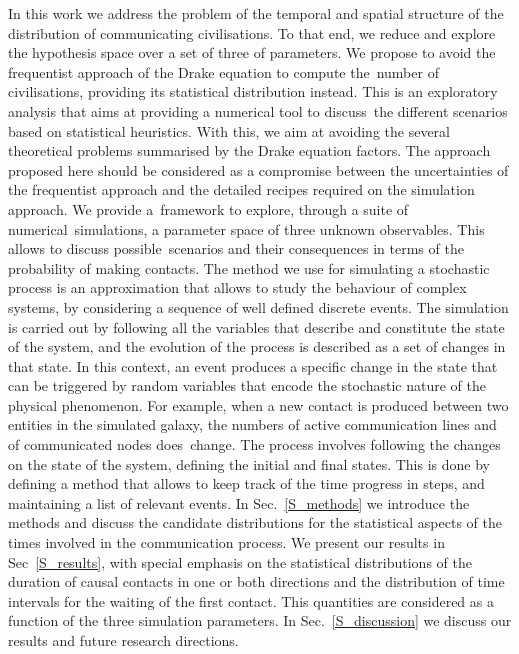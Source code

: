 \documentclass[crop]{CSLB}
\begin{document}
In this work we address the problem of the temporal and spatial structure of the distribution of communicating civilisations.
%
To that end, we reduce and explore the hypothesis space over a set of three of parameters.
%
We propose to avoid the frequentist approach of the Drake equation to compute the number of civilisations, providing its statistical distribution instead.
%
This is an exploratory analysis that aims at providing a numerical tool to discuss the different scenarios based on statistical heuristics.
%
With this, we aim at avoiding the several theoretical problems summarised by the Drake equation factors.
%
The approach proposed here should be considered as a compromise between the uncertainties of the frequentist approach and the detailed recipes required on the simulation approach.
%
We provide a framework to explore, through a suite of numerical simulations, a parameter space of three unknown observables.
%
This allows to discuss possible scenarios and their consequences in terms of the probability of making contacts.
%
The method we use for simulating a stochastic process is an approximation that allows to study the behaviour of complex systems, by considering a sequence of well defined discrete events.
%
The simulation is carried out by following all the variables that describe and constitute the state of the system, and the evolution of the process is described as a set of changes in that state.
%
In this context, an event produces a specific change in the state that can be triggered by random variables that encode the stochastic nature of the physical phenomenon.
%
For example, when a new contact is produced between two entities in the simulated galaxy, the numbers of active communication lines and of communicated nodes does change.
%
The process involves following the changes on the state of the system, defining the initial and final states.
%
This is done by defining a method that allows to keep track of the time progress in steps, and maintaining a list of relevant events.
%
In Sec.~\ref{S_methods} we introduce the methods and discuss the candidate distributions for the statistical aspects of the times involved in the communication process.
%
We present our results in Sec~\ref{S_results}, with special emphasis on the statistical distributions of the duration of causal contacts in one or both directions and the distribution of time intervals for the waiting of the first contact.
%
This quantities are considered as a function of the three simulation parameters.
%
In Sec.~\ref{S_discussion} we discuss our results and future research directions. 
 
\end{document}
